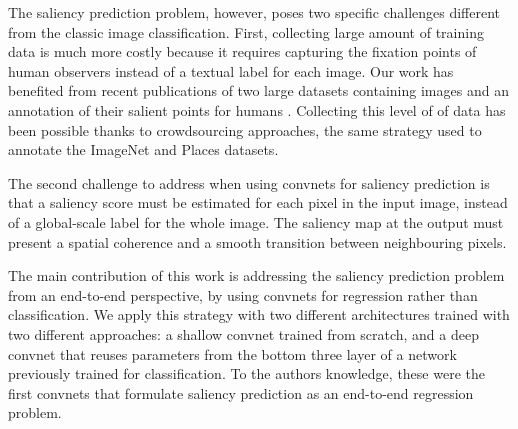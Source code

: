 \documentclass[10pt,twocolumn,letterpaper]{article}
\begin{document}
The saliency prediction problem, however, poses two specific challenges different from the classic image classification.
First, collecting large amount of training data is much more costly because it requires capturing the fixation points of human observers instead of a textual label for each image.
Our work has benefited from recent publications of two 
large datasets containing images and an annotation of their salient points for humans \cite{jiang2015salicon, xu2015turkergaze}.
Collecting this level of of data has been possible thanks to crowdsourcing approaches, the same strategy used to annotate the ImageNet and Places datasets.



The second challenge to address when using convnets for saliency prediction is that a saliency score must be estimated for each pixel in the input image, instead of a global-scale label for the whole image.
The saliency map at the output must present a spatial coherence and a smooth transition between neighbouring pixels.

The main contribution of this work is addressing the saliency prediction problem from an end-to-end perspective, by using convnets for regression rather than classification. 
We apply this strategy with two different architectures trained with two different approaches:
a shallow convnet trained from scratch, and a deep convnet that reuses parameters from the bottom three layer of a network previously trained for classification.
To the authors knowledge, these were the first convnets that formulate saliency prediction as an end-to-end regression problem.
\end{document}
